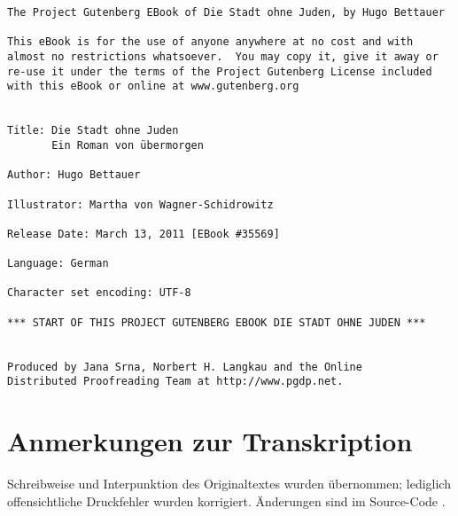 \usepackage[german,ngerman]{babel}
\usepackage[T1]{fontenc}



\renewcommand*{\tb}[1]{\begin{center}#1\end{center}}
\newcommand*{\latein}[1]{#1}
\newcommand*{\unterschrift}[1]{\begin{flushright}#1\end{flushright}}

\renewcommand*{\pagenum}[1]{\marginline{#1}}

\newcommand\Zwickerl{\discretionary{Zwik-}{kerl}{Zwickerl}}


\raggedbottom

\begin{Verbatim}[fontsize=\footnotesize]
The Project Gutenberg EBook of Die Stadt ohne Juden, by Hugo Bettauer

This eBook is for the use of anyone anywhere at no cost and with
almost no restrictions whatsoever.  You may copy it, give it away or
re-use it under the terms of the Project Gutenberg License included
with this eBook or online at www.gutenberg.org


Title: Die Stadt ohne Juden
       Ein Roman von übermorgen

Author: Hugo Bettauer

Illustrator: Martha von Wagner-Schidrowitz

Release Date: March 13, 2011 [EBook #35569]

Language: German

Character set encoding: UTF-8

*** START OF THIS PROJECT GUTENBERG EBOOK DIE STADT OHNE JUDEN ***


Produced by Jana Srna, Norbert H. Langkau and the Online
Distributed Proofreading Team at http://www.pgdp.net.
\end{Verbatim}

\section{Anmerkungen zur Transkription}

Schreibweise und Interpunktion des Originaltextes wurden
übernommen; lediglich offensichtliche Druckfehler wurden
korrigiert. Änderungen sind im Source-Code
.

